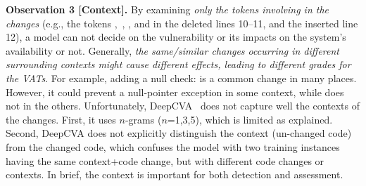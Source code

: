 \vspace{2pt}
{\bf Observation 3 [Context].} By examining {\em only the
  tokens involving in the changes} (e.g., the tokens
,~, , and
 in the deleted lines 10--11, and the inserted line 12),
a model can not decide on the vulnerability or its impacts on the
system's availability or not. Generally, {\em the same/similar changes
  occurring in different surrounding contexts might cause different
  effects, leading to different grades for the VATs}. For example,
adding a null check:  is a common change in many
places. However, it could prevent a null-pointer exception in some
context, while does not in the others.
Unfortunately, DeepCVA~\cite{deepCVA-ase21} does not capture well the
contexts of the changes. First, it uses $n$-grams ($n$=1,3,5), which
is limited as explained. Second, DeepCVA does not explicitly
distinguish the context (un-changed code) from the changed code, which
confuses the model with two training instances having the same
context+code change, but with different code changes or contexts. In
brief, the context is important for both detection and assessment.

